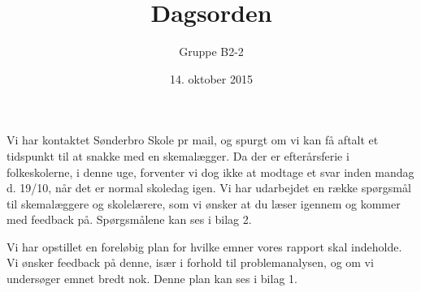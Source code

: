 \documentclass[hidelinks, 12pt]{article}
\newcommand{\group}{B2-2}
\begin{document}
	
	\title{Dagsorden}
	\author{Gruppe \group}
	\date{14. oktober 2015}
	\maketitle
	
	Vi har kontaktet Sønderbro Skole pr mail, og spurgt om vi kan få aftalt et tidspunkt til at snakke med en skemalægger. Da der er efterårsferie i folkeskolerne, i denne uge, forventer vi dog ikke at modtage et svar inden mandag d. 19/10, når det er normal skoledag igen.  Vi har udarbejdet en række spørgsmål til skemalæggere og skolelærere, som vi ønsker at du læser igennem og kommer med feedback på. Spørgsmålene kan ses i bilag 2.

	Vi har opstillet en foreløbig plan for hvilke emner vores rapport skal indeholde. Vi ønsker feedback på denne, især i forhold til problemanalysen, og om vi undersøger emnet bredt nok. Denne plan kan ses i bilag 1.
\end{document}

